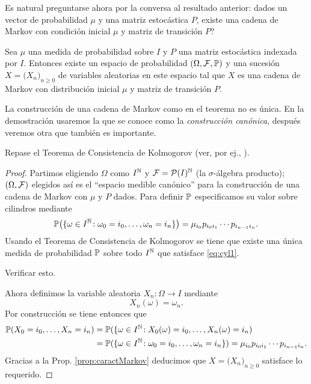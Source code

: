 Es natural preguntarse ahora por la conversa al resultado anterior: dados un vector de probabilidad $\mu$ y una matriz estocástica $P$, existe una cadena de Markov con condición inicial $\mu$ y matriz de transición $P$?

\begin{thm}
Sea $\mu$ una medida de probabilidad sobre $I$ y $P$ una matriz estocástica indexada por $I$.
Entonces existe un espacio de probabilidad $(\Omega,\mathcal{F},\mathbb{P})$ y una sucesión $X=\big(X_n\big)_{n\geq0}$ de variables aleatorias en este espacio tal que $X$ es una cadena de Markov con distribución inicial $\mu$ y matriz de transición $P$.
\end{thm}

La construcción de una cadena de Markov como en el teorema no es única.
En la demostración usaremos la que se conoce como la \emph{construcción canónica}, después veremos otra que también es importante.

\begin{sqgnote}
Repase el Teorema de Consistencia de Kolmogorov (ver, por ej., \cite{medidaJSM}).
\end{sqgnote}

\begin{proof}
Partimos eligiendo $\Omega$ como $I^{\mathbb{N}}$ y $\mathcal{F}=\mathcal{P}(I)^{\mathbb{N}}$ (la $\sigma$-álgebra producto); $(\Omega,\mathcal{F})$ elegidos así es el ``espacio medible canónico'' para la construcción de una cadena de Markov con $\mu$ y $P$ dados.
Para definir $\mathbb{P}$ especificamos su valor sobre cilindros mediante
\begin{equation}\label{eq:cyl1}
\mathbb{P}\big(\{\omega\in I^{\mathbb{N}}\!:\omega_{0}=i_0,\dotsc,\omega_n=i_n\}\big)=\mu_{i_0}p_{i_0i_1}\dotsm p_{i_{n-1}i_n}.
\end{equation}
Usando el Teorema de Consistencia de Kolmogorov se tiene que existe una única medida de probabilidad $\mathbb{P}$ sobre todo $I^{\mathbb{N}}$ que satisface \eqref{eq:cyl1}.

\begin{exer}
Verificar esto.
\end{exer}

\noindent Ahora definimos la variable aleatoria $X_n\!:\Omega\longrightarrow I$ mediante
\[X_n(\omega)=\omega_n.\]
Por construcción se tiene entonces que
\begin{align}
\mathbb{P}(X_0=i_0,\dotsc,X_n=i_n)&=\mathbb{P}(\{\omega\in I^{\mathbb{N}}\!:X_0(\omega)=i_0,\dotsc,X_n(\omega)=i_n)\\
&=\mathbb{P}(\{\omega\in I^{\mathbb{N}}\!:\omega_{0}=i_0,\dotsc,\omega_n=i_n\})=\mu_{i_0}p_{i_0i_1}\dotsm p_{i_{n-1}i_n}.
\end{align}
Gracias a la Prop. \ref{prop:caractMarkov} deducimos que $X=\big(X_n\big)_{n\geq0}$ satisface lo requerido.
\end{proof}

